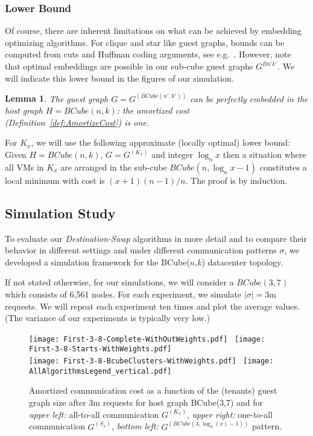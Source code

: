 \documentclass[conference]{IEEEtran}
\newtheorem{lemma}{Lemma}
\def\BC#1#2{BCube(#1,#2)}
\begin{document}
\subsubsection{Lower Bound}

Of course, there are inherent limitations on what can be achieved by embedding optimizing algorithms.
For clique and star like guest graphs, bounds can be computed from cuts and Huffman coding arguments, see e.g.~\cite{ipdps13}.
However, note that optimal embeddings are possible in our sub-cube guest graphs $G^{B{n'}{k'}}$. We will indicate
this lower bound in the figures of our simulation.

\begin{lemma}
 The guest graph $G=G^{(\BC{n'}{k'})}$ can be perfectly embedded in the host graph $H=\BC{n}{k}$: the amortized cost (Definition~\ref{def:AmortizeCost}) is one.
\end{lemma}



For $K_{x}$, we will use the following approximate (locally optimal) lower bound:
Given $H=\BC{n}{k}$, $G=G^{(K_{x})}$ and integer $\log_{n}{x}$ then a situation where all VMs in $K_{x}$ are arranged in the sub-cube $\BC{n}{\log_{n}{x}-1}$
constitutes a local minimum with cost is $(x+1)(n-1)/n$. The proof is by induction.





\subsection{Simulation Study}

To evaluate our \emph{Destination-Swap} algorithms in more detail and to compare their behavior in different settings and under
different communication patterns $\sigma$, we developed a simulation framework for the \BC{$n$}{$k$} datacenter topology.


If not stated otherwise, for our simulations, we will
consider a $\BC{3}{7}$ which consists of 6,561 nodes.
For each experiment, we simulate $|\sigma|=3$m requests.
We will repeat each experiment ten times and plot the average
values. (The variance of our experiments is typically very low.)


	\begin{figure}[h]
				\centering
				\texttt{[image: First-3-8-Complete-WithOutWeights.pdf]}~				 \texttt{[image: First-3-8-Starts-WithWeights.pdf]}\\
				\texttt{[image: First-3-8-BcubeClusters-WithWeights.pdf]}~      \texttt{[image: AllAlgorithmsLegend\_vertical.pdf]}
				\caption{Amortized communication cost as a function of the (tenants) guest graph size after 3m requests for host graph \BC{3}{7} and for \emph{upper left:} all-to-all communication $G^{(K_{x})}$,
\emph{upper right:} one-to-all communication $G^{(S_{x})}$, \emph{bottom left:} $G^{(\BC{3}{\log_3(x)-1})}$ pattern.}
				\label{fig:First-3-8-Complete-WithOutWeights}
				\end{figure}
				
\end{document}
